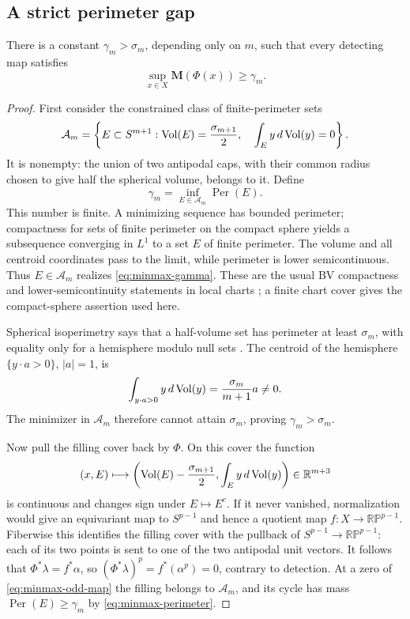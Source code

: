 \subsection{A strict perimeter gap}

\begin{lemma}\label{lem:detection-gap}
There is a constant $\gamma_m>\sigma_m$, depending only on $m$,
such that every detecting map satisfies
\[
 \sup_{x\in X}\mathbf M(\Phi(x))\ge\gamma_m.
\]
\end{lemma}

\begin{proof}
First consider the constrained class of finite-perimeter sets
\[
 \mathcal A_m=\left\{E\subset S^{m+1}:
   \operatorname{Vol}(E)=\frac{\sigma_{m+1}}2,\quad
   \int_E y\,d\operatorname{Vol}(y)=0\right\}.
\]
It is nonempty: the union of two antipodal caps, with their common
radius chosen to give half the spherical volume, belongs to it.
Define
\begin{equation}\label{eq:minmax-gamma}
 \gamma_m=\inf_{E\in\mathcal A_m}\operatorname{Per}(E).
\end{equation}
This number is finite. A minimizing sequence has bounded perimeter;
compactness for sets of finite perimeter on the compact sphere yields
a subsequence converging in $L^1$ to a set $E$ of finite perimeter.
The volume and all centroid coordinates pass to the limit, while
perimeter is lower semicontinuous. Thus $E\in\mathcal A_m$ realizes
\eqref{eq:minmax-gamma}. These are the usual BV compactness and
lower-semicontinuity statements in local charts
\cite[Chapter~2, Theorem~2.6, pp.~54--55]{SimonGMT}; a finite chart cover gives
the compact-sphere assertion used here.

Spherical isoperimetry says that a half-volume set has perimeter at
least $\sigma_m$, with equality only for a hemisphere modulo null
sets \cite[\S2.3, equation~(2.2), p.~5]{BDFSphere}. The centroid of
the hemisphere $\{y\cdot a>0\}$, $|a|=1$, is
\[
 \int_{y\cdot a>0} y\,d\operatorname{Vol}(y)=\frac{\sigma_m}{m+1}a\ne0.
\]
The minimizer in $\mathcal A_m$ therefore cannot attain
$\sigma_m$, proving $\gamma_m>\sigma_m$.

Now pull the filling cover back by $\Phi$. On this cover the function
\begin{equation}\label{eq:minmax-odd-map}
 (x,E)\longmapsto
 \left(\operatorname{Vol}(E)-\frac{\sigma_{m+1}}2,
       \int_E y\,d\operatorname{Vol}(y)\right)\in\mathbb R^{m+3}
\end{equation}
is continuous and changes sign under $E\mapsto E^c$. If it never
vanished, normalization would give an equivariant map to $S^{p-1}$
and hence a quotient map $f:X\to\mathbb{RP}^{p-1}$. Fiberwise this
identifies the filling cover with the pullback of
$S^{p-1}\to\mathbb{RP}^{p-1}$: each of its two points is sent to
one of the two antipodal unit vectors. It follows that
$\Phi^*\lambda=f^*\alpha$, so
$(\Phi^*\lambda)^p=f^*(\alpha^p)=0$, contrary to detection.
At a zero of \eqref{eq:minmax-odd-map} the filling belongs to
$\mathcal A_m$, and its cycle has mass
$\operatorname{Per}(E)\ge\gamma_m$ by
\eqref{eq:minmax-perimeter}.
\end{proof}

